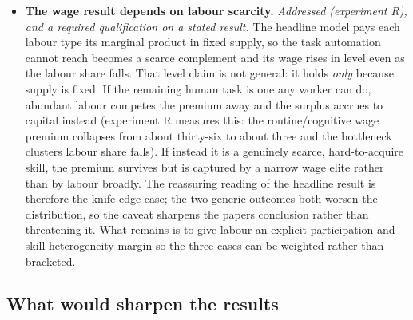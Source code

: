\documentclass[12pt]{article}
\begin{document}
\begin{itemize}
  capital, output held) rather than cyclical, which suits an automation
  model but means it does not capture demand-driven joblessness. The
  remaining limits are calibration, not structure: the displacement
  pass-through, the benefit replacement rate and the UBI labour-supply
  response are anchored to literature ranges (the calibration table in
  section 6M) but not estimated for this market, and the sensitivity
  analysis (Figure 21) shows the unemployment rate is the most
  parameter-sensitive outcome in the model, swinging on the
  pass-through, so it is reported as a range set by the
  displacement-versus-reinstatement balance rather than a point.
\item
  \textbf{The wage result depends on labour scarcity.}
  \emph{Addressed (experiment R), and a required qualification on a
  stated result.} The headline model pays each labour type its marginal
  product in fixed supply, so the task automation cannot reach becomes a
  scarce complement and its wage rises in level even as the labour share
  falls. That level claim is not general: it holds \emph{only} because
  supply is fixed. If the remaining human task is one any worker can do,
  abundant labour competes the premium away and the surplus accrues to
  capital instead (experiment R measures this: the routine/cognitive wage
  premium collapses from about thirty-six to about three and the
  bottleneck cluster\textquotesingle s labour share falls). If instead it
  is a genuinely scarce, hard-to-acquire skill, the premium survives but
  is captured by a narrow wage elite rather than by labour broadly. The
  reassuring reading of the headline result is therefore the knife-edge
  case; the two generic outcomes both worsen the distribution, so the
  caveat sharpens the paper\textquotesingle s conclusion rather than
  threatening it. What remains is to give labour an explicit
  participation and skill-heterogeneity margin so the three cases can be
  weighted rather than bracketed.
\end{itemize}

\hypertarget{what-would-sharpen-the-results}{%
\subsection{What would sharpen the
results}\label{what-would-sharpen-the-results}}
\end{document}
